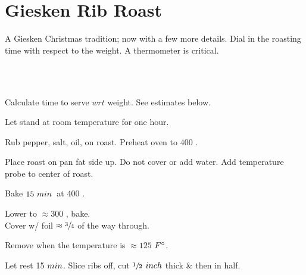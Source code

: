 \section[Rib Roast]{Giesken Rib Roast}

\begin{recipestats}[
        servings=\onehalf~\pound/person,
        preptime=1\onehalf~\hour,
        bakingtime=$\approx4~\hour$,
        inactivetime=1\onehalf~\hour,
        source=Giesken~Family,
    ]
\end{recipestats}

\begin{recipeabstract}
    A Giesken Christmas tradition; now with a few more details.
    Dial in the roasting time with respect to the weight.
    A thermometer is critical.
\end{recipeabstract}

\begin{ingredientcolumns}[1]
    \begin{ingredientblock}
        \\
        \\
    \end{ingredientblock}
\end{ingredientcolumns}

\begin{preparation}
\item Calculate time to serve $wrt$ weight.
    See estimates below.

\item Let stand at room temperature for one hour.

\item Rub pepper, salt, oil, on roast. Preheat oven to $400$ \Fahrenheit.

\item Place roast on pan fat side up.
    Do not cover or add water.
    Add temperature probe to center of roast.

\item Bake $15~\minute$~at 400 \Fahrenheit.

\item Lower to $\approx 300$ \Fahrenheit, bake.\\
    Cover w/ foil $\approx \threefourth$ of the way through.

\item Remove when the temperature is $\approx 125$ $\Fahrenheit$.

\item Let rest 15 $\minute$.
    Slice ribs off, cut $\onehalf$ $\inch$ thick \& then in half.

\end{preparation}

